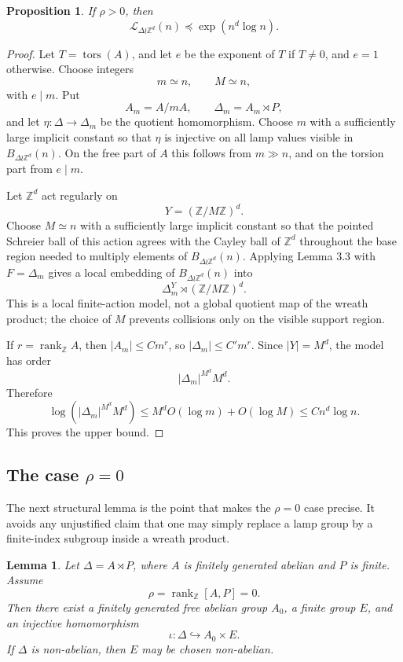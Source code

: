 \documentclass[11pt]{article}
\newcommand{\LEF}{\mathcal L}
\newcommand{\Z}{\mathbb Z}
\newcommand{\rank}{\operatorname{rank}}
\newcommand{\tors}{\operatorname{tors}}
\newtheorem{proposition}[theorem]{Proposition}
\newtheorem{lemma}[theorem]{Lemma}
\begin{document}
\begin{proposition}
If \(\rho>0\), then
\[
\LEF_{\Delta\wr\Z^d}(n)\preceq \exp(n^d\log n).
\]
\end{proposition}

\begin{proof}
Let \(T=\tors(A)\), and let \(e\) be the exponent of \(T\) if \(T\neq 0\), and \(e=1\) otherwise. Choose integers
\[
m\simeq n,\qquad M\simeq n,
\]
with \(e\mid m\). Put
\[
A_m=A/mA,\qquad \Delta_m=A_m\rtimes P,
\]
and let \(\eta:\Delta\to\Delta_m\) be the quotient homomorphism. Choose \(m\) with a sufficiently large implicit constant so that \(\eta\) is injective on all lamp values visible in \(B_{\Delta\wr\Z^d}(n)\). On the free part of \(A\) this follows from \(m\gg n\), and on the torsion part from \(e\mid m\).

Let \(\Z^d\) act regularly on
\[
Y=(\Z/M\Z)^d.
\]
Choose \(M\simeq n\) with a sufficiently large implicit constant so that the pointed Schreier ball of this action agrees with the Cayley ball of \(\Z^d\) throughout the base region needed to multiply elements of \(B_{\Delta\wr\Z^d}(n)\). Applying Lemma 3.3 with \(F=\Delta_m\) gives a local embedding of \(B_{\Delta\wr\Z^d}(n)\) into
\[
\Delta_m^Y\rtimes(\Z/M\Z)^d.
\]
This is a local finite-action model, not a global quotient map of the wreath product; the choice of \(M\) prevents collisions only on the visible support region.

If \(r=\rank_\Z A\), then \(|A_m|\le Cm^r\), so \(|\Delta_m|\le C'm^r\). Since \(|Y|=M^d\), the model has order
\[
|\Delta_m|^{M^d}M^d.
\]
Therefore
\[
\log\left(|\Delta_m|^{M^d}M^d\right)\le M^dO(\log m)+O(\log M)\le Cn^d\log n.
\]
This proves the upper bound.
\end{proof}

\subsection{The case \(\rho=0\)}

The next structural lemma is the point that makes the \(\rho=0\) case precise. It avoids any unjustified claim that one may simply replace a lamp group by a finite-index subgroup inside a wreath product.

\begin{lemma}
Let \(\Delta=A\rtimes P\), where \(A\) is finitely generated abelian and \(P\) is finite. Assume
\[
\rho=\rank_\Z[A,P]=0.
\]
Then there exist a finitely generated free abelian group \(A_0\), a finite group \(E\), and an injective homomorphism
\[
\iota:\Delta\hookrightarrow A_0\times E.
\]
If \(\Delta\) is non-abelian, then \(E\) may be chosen non-abelian.
\end{lemma}
\end{document}
